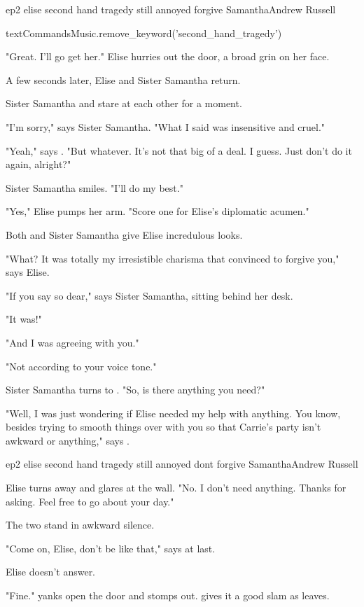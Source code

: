 \documentclass{book}
\begin{document}
\begin{childnode}{ep2 elise second hand tragedy still annoyed forgive Samantha}{Andrew Russell}

    \begin{code}

        textCommandsMusic.remove\_keyword('second\_hand\_tragedy')

    \end{code}

    "Great. I'll go get her." Elise hurries out the door, a broad grin on her face.

    A few seconds later, Elise and Sister Samantha return.

    Sister Samantha and \name{} stare at each other for a moment.

    "I'm sorry," says Sister Samantha. "What I said was insensitive and cruel."

    "Yeah," says \name{}. "But whatever. It's not that big of a deal. I guess. Just don't do it again, alright?"

    Sister Samantha smiles. "I'll do my best."

    "Yes," Elise pumps her arm. "Score one for Elise's diplomatic acumen."

    Both \name{} and Sister Samantha give Elise incredulous looks.

    "What? It was totally my irresistible charisma that convinced \name{} to forgive you," says Elise.

    "If you say so dear," says Sister Samantha, sitting behind her desk.

    "It was!"

    "And I was agreeing with you."

    "Not according to your voice tone."

    Sister Samantha turns to \name{}. "So, is there anything you need?"

    "Well, I was just wondering if Elise needed my help with anything. You know, besides trying to smooth things over with you so that Carrie's party isn't awkward or anything," says \name{}.


\end{childnode}

\begin{childnode}{ep2 elise second hand tragedy still annoyed dont forgive Samantha}{Andrew Russell}


    Elise turns away and glares at the wall. "No. I don't need anything. Thanks for asking. Feel free to go about your day."

    The two stand in awkward silence.

    "Come on, Elise, don't be like that," says \name{} at last.

    Elise doesn't answer.

    "Fine." \name{} yanks open the door and stomps out. \HeShe{} gives it a good slam as \heshe{} leaves.

\end{childnode}
\end{document}
